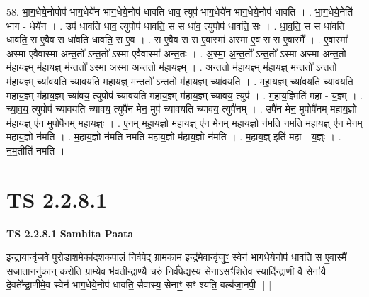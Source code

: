 \documentclass[17pt]{extarticle}
\begin{document}
58. भा॒ग॒धेये॒नोपोप॑ भाग॒धेये॑न भाग॒धेये॒नोप॑ धावति धाव॒ त्युप॑ भाग॒धेये॑न भाग॒धेये॒नोप॑ धावति । . भा॒ग॒धेये॒नेति॑ भाग - धेये॑न । . उप॑ धावति धाव॒ त्युपोप॑ धावति॒ स स धा॑व॒ त्युपोप॑ धावति॒ सः । . धा॒व॒ति॒ स स धा॑वति धावति॒ स ए॒वैव स धा॑वति धावति॒ स ए॒व । . स ए॒वैव स स ए॒वास्मा॑ अस्मा ए॒व स स ए॒वास्मै᳚ । . ए॒वास्मा॑ अस्मा ए॒वैवास्मा॑ अन्त॒तो᳚ ऽन्त॒तो᳚ ऽस्मा ए॒वैवास्मा॑ अन्त॒तः । . अ॒स्मा॒ अ॒न्त॒तो᳚ ऽन्त॒तो᳚ ऽस्मा अस्मा अन्त॒तो म॑हाय॒ज्ञ्म् म॑हाय॒ज्ञ् म॑न्त॒तो᳚ ऽस्मा अस्मा अन्त॒तो म॑हाय॒ज्ञ्म् । . अ॒न्त॒तो म॑हाय॒ज्ञ्म् म॑हाय॒ज्ञ् म॑न्त॒तो᳚ ऽन्त॒तो म॑हाय॒ज्ञ्म् च्या॑वयति च्यावयति महाय॒ज्ञ् म॑न्त॒तो᳚ ऽन्त॒तो म॑हाय॒ज्ञ्म् च्या॑वयति । . म॒हा॒य॒ज्ञ्म् च्या॑वयति च्यावयति महाय॒ज्ञ्म् म॑हाय॒ज्ञ्म् च्या॑वय॒ त्युपोप॑ च्यावयति महाय॒ज्ञ्म् म॑हाय॒ज्ञ्म् च्या॑वय॒ त्युप॑ । . म॒हा॒य॒ज्ञ्मिति॑ महा - य॒ज्ञ्म् । . च्या॒व॒य॒ त्युपोप॑ च्यावयति च्यावय॒ त्युपै॑न मेन॒ मुप॑ च्यावयति च्यावय॒ त्युपै॑नम् । . उपै॑न मेन॒ मुपोपै॑नम् महाय॒ज्ञो म॑हाय॒ज्ञ् ए॑न॒ मुपोपै॑नम् महाय॒ज्ञ्ः । . ए॒न॒म् म॒हा॒य॒ज्ञो म॑हाय॒ज्ञ् ए॑न मेनम् महाय॒ज्ञो न॑मति नमति महाय॒ज्ञ् ए॑न मेनम् महाय॒ज्ञो न॑मति । . म॒हा॒य॒ज्ञो न॑मति नमति महाय॒ज्ञो म॑हाय॒ज्ञो न॑मति । . म॒हा॒य॒ज्ञ् इति॑ महा - य॒ज्ञ्ः । . न॒म॒तीति॑ नमति । \newline
\pagebreak
{}

\section{ TS 2.2.8.1 }

\textbf{TS 2.2.8.1 } \newline
\textbf{Samhita Paata} \newline

इन्द्रा॒यान्वृ॑जवे पुरो॒डाश॒मेका॑दशकपालं॒ निर्व॑पे॒द् ग्राम॑काम॒ इन्द्र॑मे॒वान्वृ॑जुꣳ॒॒ स्वेन॑ भाग॒धेये॒नोप॑ धावति॒ स ए॒वास्मै॑ सजा॒ताननु॑कान् करोति ग्रा॒म्ये॑व भ॑वतीन्द्रा॒ण्यै च॒रुं निर्व॑पे॒द्यस्य॒ सेनाऽसꣳ॑शितेव॒ स्यादि॑न्द्रा॒णी वै सेना॑यै दे॒वते᳚न्द्रा॒णीमे॒व स्वेन॑ भाग॒धेये॒नोप॑ धावति॒ सैवास्य॒ सेनाꣳ॒॒ सꣳ श्य॑ति॒ बल्ब॑जा॒नपी॒-  [  ] \newline
\end{document}
